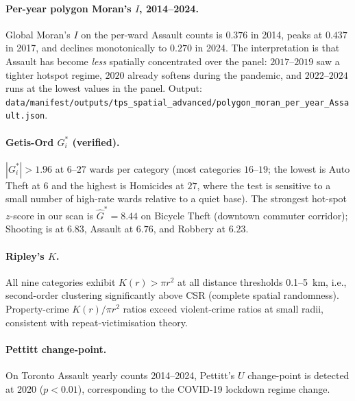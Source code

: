 \documentclass[article,shortnames,nojss]{jss}
\begin{document}
\paragraph{Per-year polygon Moran's $I$, 2014--2024.}  Global
Moran's $I$ on the per-ward Assault counts is $0.376$ in
2014, peaks at $0.437$ in 2017, and declines monotonically to
$0.270$ in 2024.  The interpretation is that Assault has
become \emph{less} spatially concentrated over the panel:
$2017$--$2019$ saw a tighter hotspot regime, $2020$ already
softens during the pandemic, and $2022$--$2024$ runs at the
lowest values in the panel.  Output:
\texttt{data/manifest/outputs/tps\_spatial\_advanced/polygon\_moran\_per\_year\_Assault.json}.

\paragraph{Getis-Ord $G^\ast_i$ (verified).}  $|G^\ast_i|>1.96$
at $6$--$27$ wards per category (most categories $16$--$19$;
the lowest is Auto Theft at $6$ and the highest is Homicides at
$27$, where the test is sensitive to a small number of high-rate
wards relative to a quiet base).  The strongest hot-spot
$z$-score in our scan is $\hat G^\ast = 8.44$ on Bicycle Theft
(downtown commuter corridor); Shooting is at $6.83$, Assault at
$6.76$, and Robbery at $6.23$.

\paragraph{Ripley's $K$.}  All nine categories exhibit
$K(r)>\pi r^2$ at all distance thresholds 0.1--5~km, i.e.,
second-order clustering significantly above CSR (complete spatial
randomness).  Property-crime $K(r)/\pi r^2$ ratios exceed
violent-crime ratios at small radii, consistent with
repeat-victimisation theory.


\paragraph{Pettitt change-point.}  On Toronto Assault yearly counts
2014--2024, Pettitt's $U$ change-point is detected at 2020
($p<0.01$), corresponding to the COVID-19 lockdown regime change.

\end{document}
